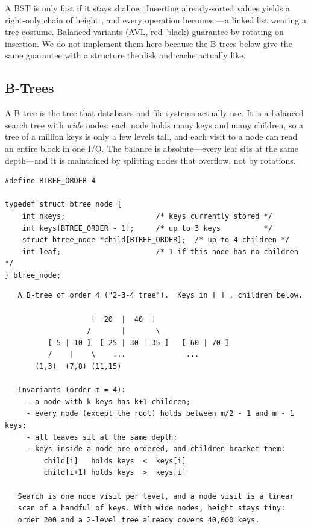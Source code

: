 \begin{insight}
A BST is only fast if it stays shallow. Inserting already-sorted
values yields a right-only chain of height , and every
operation becomes ---a linked list wearing a tree costume.
Balanced variants (AVL, red--black) guarantee  by
rotating on insertion. We do not implement them here because the
B-trees below give the same guarantee with a structure the disk and
cache actually like.
\end{insight}

\subsection{B-Trees}

A B-tree is the tree that databases and file systems actually use. It
is a balanced search tree with \emph{wide} nodes: each node holds many
keys and many children, so a tree of a million keys is only a few
levels tall, and each visit to a node can read an entire block in one
I/O. The balance is absolute---every leaf sits at the same depth---and
it is maintained by splitting nodes that overflow, not by rotations.

\begin{lstlisting}[caption={A B-tree node of order 4 (max 3 keys, 4 children).}]
#define BTREE_ORDER 4

typedef struct btree_node {
    int nkeys;                     /* keys currently stored */
    int keys[BTREE_ORDER - 1];     /* up to 3 keys          */
    struct btree_node *child[BTREE_ORDER];  /* up to 4 children */
    int leaf;                      /* 1 if this node has no children */
} btree_node;
\end{lstlisting}

\begin{verbatim}
   A B-tree of order 4 ("2-3-4 tree").  Keys in [ ] , children below.

                    [  20  |  40  ]
                   /       |       \
          [ 5 | 10 ]  [ 25 | 30 | 35 ]   [ 60 | 70 ]
          /    |    \    ...              ...
       (1,3)  (7,8) (11,15)

   Invariants (order m = 4):
     - a node with k keys has k+1 children;
     - every node (except the root) holds between m/2 - 1 and m - 1 keys;
     - all leaves sit at the same depth;
     - keys inside a node are ordered, and children bracket them:
         child[i]   holds keys  <  keys[i]
         child[i+1] holds keys  >  keys[i]

   Search is one node visit per level, and a node visit is a linear
   scan of a handful of keys. With wide nodes, height stays tiny:
   order 200 and a 2-level tree already covers 40,000 keys.
\end{verbatim}

